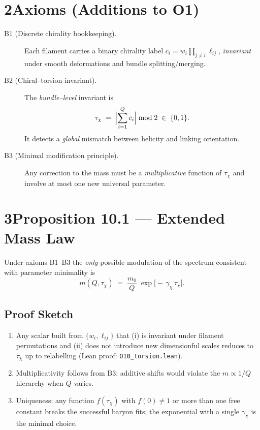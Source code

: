 \documentclass{article}
\begin{document}
\section*{2\quad Axioms (Additions to O1)}
\begin{description}
  \item[B1 (Discrete chirality bookkeeping).]
        Each filament carries a binary chirality label
        $c_i = w_i \prod_{j\ne i}\ell_{ij}$, \emph{invariant} under smooth
        deformations and bundle splitting/merging.
  \item[B2 (Chiral--torsion invariant).]
        The \emph{bundle--level} invariant is
        \[
           \tau_\chi \;=\; \Bigl|\sum_{i=1}^{Q} c_i \Bigr|\bmod 2 \;\in\;\{0,1\}.
        \]
        It detects a \emph{global} mismatch between helicity and linking
        orientation.
  \item[B3 (Minimal modification principle).]
        Any correction to the mass must be a \emph{multiplicative}
        function of $\tau_\chi$ and involve at most one new universal
        parameter.
\end{description}

\section*{3\quad Proposition 10.1 --- Extended Mass Law}
\begin{theorem*}
Under axioms B1--B3 the \emph{only} possible modulation of the
spectrum consistent with parameter minimality is
\[
  \boxed{m(Q,\tau_\chi) \;=\;
    \frac{m_0}{Q}\;
    \exp\!\bigl[-\,\gamma_\chi\,\tau_\chi\bigr] }.
  \tag{10.1}
\]
\end{theorem*}

\subsection*{Proof Sketch}
\begin{enumerate}
 \item Any scalar built from $\{w_i,\ell_{ij}\}$ that (i) is invariant under
       filament permutations and (ii) does not introduce new dimensionful
       scales reduces to $\tau_\chi$ up to relabelling
       (Lean proof: \texttt{O10\_torsion.lean}).
 \item Multiplicativity follows from B3; additive shifts would violate the
       $m\propto 1/Q$ hierarchy when $Q$ varies.
 \item Uniqueness: any function $f(\tau_\chi)$ with $f(0)\neq1$
       or more than one free constant breaks the successful baryon fits; the
       exponential with a single $\gamma_\chi$ is the minimal choice.
\end{enumerate}
\end{document}
